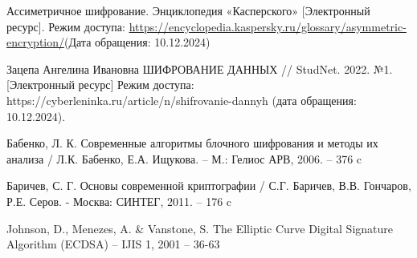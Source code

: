 \begin{thebibliography}{}
	
	 Ассиметричное шифрование. Энциклопедия «Касперского» [Электронный  ресурс]. Режим доступа:
	\url{https://encyclopedia.kaspersky.ru/glossary/asymmetric-encryption/}(Дата обращения: 10.12.2024) 
	
	 Зацепа Ангелина Ивановна ШИФРОВАНИЕ ДАННЫХ // StudNet. 2022. №1. [Электронный ресурс] Режим доступа: https://cyberleninka.ru/article/n/shifrovanie-dannyh (дата обращения: 10.12.2024).
	
	 Бабенко, Л. К. Современные алгоритмы блочного шифрования и методы их анализа / Л.К. Бабенко, Е.А. Ищукова. -- М.: Гелиос АРВ, 2006. -- 376 c
	
	 Баричев, С. Г. Основы современной криптографии / С.Г. Баричев, В.В. Гончаров, Р.Е. Серов. - Москва: СИНТЕГ, 2011. -- 176 c
	
	 Johnson, D., Menezes, A. \& Vanstone, S. The Elliptic Curve Digital Signature Algorithm (ECDSA) -- IJIS 1, 2001 -- 36-63
	
\end{thebibliography}